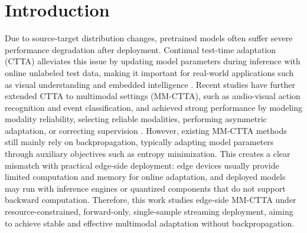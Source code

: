 \section{Introduction}

Due to source-target distribution changes, pretrained models often suffer severe performance degradation after deployment.
Continual test-time adaptation (CTTA) alleviates this issue by updating model parameters during inference with online unlabeled test data, making it important for real-world applications such as visual understanding and embedded intelligence \citep{wang2022continualtta}.
Recent studies have further extended CTTA to multimodal settings (MM-CTTA), such as audio-visual action recognition and event classification, and achieved strong performance by modeling modality reliability, selecting reliable modalities, performing asymmetric adaptation, or correcting supervision \citep{guo2025smoothing,yang2024read,chen2025tsa,he2026dasp}.
However, existing MM-CTTA methods still mainly rely on backpropagation, typically adapting model parameters through auxiliary objectives such as entropy minimization.
This creates a clear mismatch with practical edge-side deployment: edge devices usually provide limited computation and memory for online adaptation, and deployed models may run with inference engines or quantized components that do not support backward computation.
Therefore, this work studies edge-side MM-CTTA under resource-constrained, forward-only, single-sample streaming deployment, aiming to achieve stable and effective multimodal adaptation without backpropagation.

